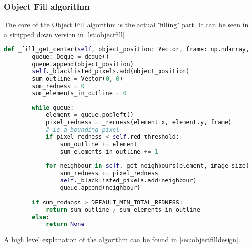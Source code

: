 \subsubsection{Object Fill algorithm}\label{solution:objfillalgo}

The core of the Object Fill algorithm is the actual "filling" part.
It can be seen in a stripped down version in \autoref{lst:objectfill}

\begin{lstlisting}[language=Python,label={lst:objectfill},caption={Stripped down version of object fill from object\_fill.py}]
    def _fill_get_center(self, object_position: Vector, frame: np.ndarray, image_size: Vector) -> Optional[Vector]:
	    queue: Deque = deque()
	    queue.append(object_position)
	    self._blacklisted_pixels.add(object_position)
	    sum_outline = Vector(0, 0)
	    sum_redness = 0
	    sum_elements_in_outline = 0
	    
	    while queue:
		    element = queue.popleft()
		    pixel_redness = _redness(element.x, element.y, frame)
		    # is a bounding pixel
		    if pixel_redness < self.red_threshold:
			    sum_outline += element
			    sum_elements_in_outline += 1
		    
		    for neighbour in self._get_neighbours(element, image_size) - self._blacklisted_pixels:
			    sum_redness += pixel_redness
			    self._blacklisted_pixels.add(neighbour)
			    queue.append(neighbour)
	    
	    if sum_redness > DEFAULT_MIN_TOTAL_REDNESS:
		    return sum_outline / sum_elements_in_outline
	    else:
		    return None
\end{lstlisting}

A high level explanation of the algorithm can be found in \autoref{sec:objectfilldesign}.